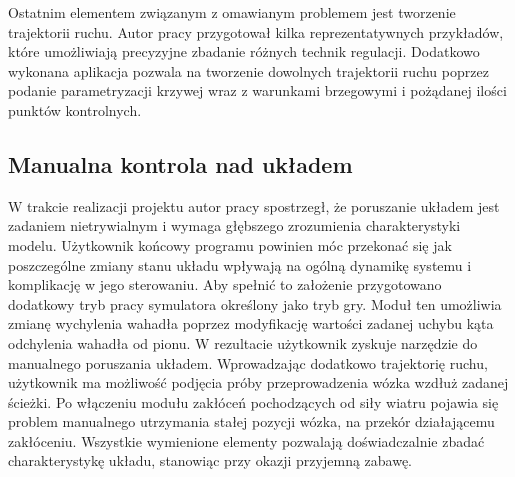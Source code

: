 \documentclass[12pt, twoside, openany]{report}
\theoremstyle{definition}
\begin{document}
Ostatnim elementem związanym z omawianym problemem jest tworzenie trajektorii ruchu. Autor pracy przygotował kilka reprezentatywnych przykładów, które umożliwiają precyzyjne zbadanie różnych technik regulacji. Dodatkowo wykonana aplikacja pozwala na tworzenie dowolnych trajektorii ruchu poprzez podanie parametryzacji krzywej wraz z warunkami brzegowymi i pożądanej ilości punktów kontrolnych.

\subsection{Manualna kontrola nad układem}
W trakcie realizacji projektu autor pracy spostrzegł, że poruszanie układem jest zadaniem nietrywialnym i wymaga głębszego zrozumienia charakterystyki modelu. Użytkownik końcowy programu powinien móc przekonać się jak poszczególne zmiany stanu układu wpływają na ogólną dynamikę systemu i komplikację w jego sterowaniu. Aby spełnić to założenie przygotowano dodatkowy tryb pracy symulatora określony jako tryb gry. Moduł ten umożliwia zmianę wychylenia wahadła poprzez modyfikację wartości zadanej uchybu kąta odchylenia wahadła od pionu. W rezultacie użytkownik zyskuje narzędzie do manualnego poruszania układem. Wprowadzając dodatkowo trajektorię ruchu, użytkownik ma możliwość podjęcia próby przeprowadzenia wózka wzdłuż zadanej ścieżki. Po włączeniu modułu zakłóceń pochodzących od siły wiatru pojawia się problem manualnego utrzymania stałej pozycji wózka, na przekór działającemu zakłóceniu. Wszystkie wymienione elementy pozwalają doświadczalnie zbadać charakterystykę układu, stanowiąc przy okazji przyjemną zabawę.
\end{document}
